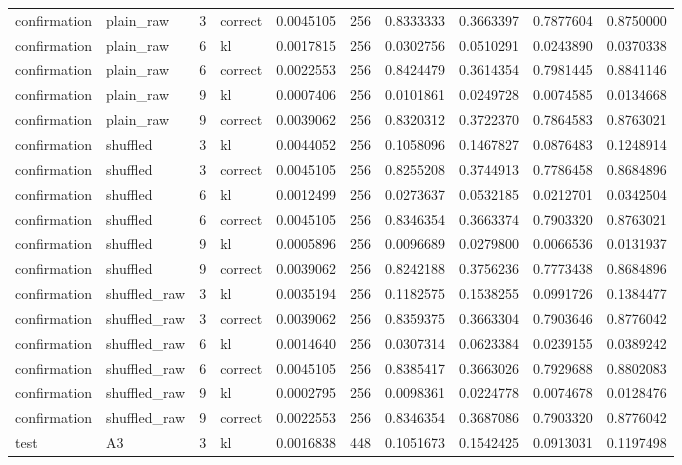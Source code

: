 \begin{tabular}{llrlrrrrrr}
confirmation & plain_raw & 3 & correct & 0.0045105 & 256 & 0.8333333 & 0.3663397 & 0.7877604 & 0.8750000 \\
confirmation & plain_raw & 6 & kl & 0.0017815 & 256 & 0.0302756 & 0.0510291 & 0.0243890 & 0.0370338 \\
confirmation & plain_raw & 6 & correct & 0.0022553 & 256 & 0.8424479 & 0.3614354 & 0.7981445 & 0.8841146 \\
confirmation & plain_raw & 9 & kl & 0.0007406 & 256 & 0.0101861 & 0.0249728 & 0.0074585 & 0.0134668 \\
confirmation & plain_raw & 9 & correct & 0.0039062 & 256 & 0.8320312 & 0.3722370 & 0.7864583 & 0.8763021 \\
confirmation & shuffled & 3 & kl & 0.0044052 & 256 & 0.1058096 & 0.1467827 & 0.0876483 & 0.1248914 \\
confirmation & shuffled & 3 & correct & 0.0045105 & 256 & 0.8255208 & 0.3744913 & 0.7786458 & 0.8684896 \\
confirmation & shuffled & 6 & kl & 0.0012499 & 256 & 0.0273637 & 0.0532185 & 0.0212701 & 0.0342504 \\
confirmation & shuffled & 6 & correct & 0.0045105 & 256 & 0.8346354 & 0.3663374 & 0.7903320 & 0.8763021 \\
confirmation & shuffled & 9 & kl & 0.0005896 & 256 & 0.0096689 & 0.0279800 & 0.0066536 & 0.0131937 \\
confirmation & shuffled & 9 & correct & 0.0039062 & 256 & 0.8242188 & 0.3756236 & 0.7773438 & 0.8684896 \\
confirmation & shuffled_raw & 3 & kl & 0.0035194 & 256 & 0.1182575 & 0.1538255 & 0.0991726 & 0.1384477 \\
confirmation & shuffled_raw & 3 & correct & 0.0039062 & 256 & 0.8359375 & 0.3663304 & 0.7903646 & 0.8776042 \\
confirmation & shuffled_raw & 6 & kl & 0.0014640 & 256 & 0.0307314 & 0.0623384 & 0.0239155 & 0.0389242 \\
confirmation & shuffled_raw & 6 & correct & 0.0045105 & 256 & 0.8385417 & 0.3663026 & 0.7929688 & 0.8802083 \\
confirmation & shuffled_raw & 9 & kl & 0.0002795 & 256 & 0.0098361 & 0.0224778 & 0.0074678 & 0.0128476 \\
confirmation & shuffled_raw & 9 & correct & 0.0022553 & 256 & 0.8346354 & 0.3687086 & 0.7903320 & 0.8776042 \\
test & A3 & 3 & kl & 0.0016838 & 448 & 0.1051673 & 0.1542425 & 0.0913031 & 0.1197498 \\

\end{tabular}

